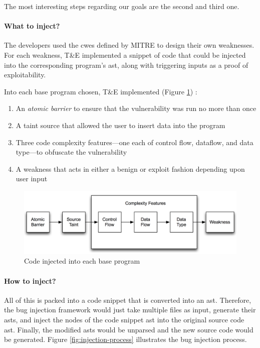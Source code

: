 The most interesting steps regarding our goals are the second and third one.

\paragraph{What to inject?}

The developers used the \glspl{cwe} defined by MITRE \cite{mitre2016cwe} to design their own weaknesses. For each weakness, T\&E implemented a snippet of code that could be injected into the corresponding program's \gls{ast}, along with triggering inputs as a proof of exploitability.

Into each base program chosen, T\&E implemented (Figure \ref{fig:injected-code}) \cite{iarpa2014stonesoup}:

\begin{enumerate}
    \item An \emph{atomic barrier} to ensure that the vulnerability was run no more than once
    \item A taint source that allowed the user to insert data into the program
    \item Three code complexity features---one each of control flow, dataflow, and data type---to obfuscate the vulnerability
    \item A weakness that acts in either a benign or exploit fashion depending upon user input
\end{enumerate}

\begin{figure}[ht]
    \centering
    \includegraphics[scale=0.43]{figures/injected-code}
    \caption{Code injected into each base program \cite{iarpa2014stonesoup}}
    \label{fig:injected-code}
\end{figure}

\paragraph{How to inject?}

All of this is packed into a code snippet that is converted into an \gls{ast}. Therefore, the bug injection framework would just take multiple files as input, generate their \glspl{ast}, and inject the nodes of the code snippet \gls{ast} into the original source code \gls{ast}. Finally, the modified \glspl{ast} would be unparsed and the new source code would be generated. Figure \ref{fig:injection-process} illustrates the bug injection process.

